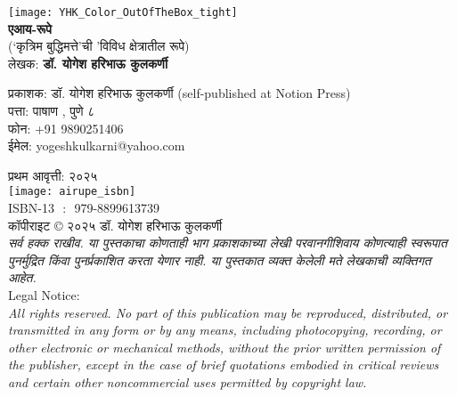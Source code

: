 \thispagestyle{empty}

\begin{center}
\texttt{[image: YHK\_Color\_OutOfTheBox\_tight]} \\[1.5em]

\textbf{\Huge एआय-रूपे}\\ [0.5em]
{\small(`कृत्रिम बुद्धिमत्ते'ची 'विविध क्षेत्रातील रूपे)}\\[0.5em]

लेखक: \textbf{{\large डॉ. योगेश हरिभाऊ कुलकर्णी}}\\[1.5em]
\end{center}

\vspace{1.5em}

\begin{flushleft}

प्रकाशक: डॉ. योगेश हरिभाऊ कुलकर्णी (self-published at Notion Press)\\
पत्ता:  पाषाण ,  पुणे ८ \\
फोन:  +91 9890251406\\
ईमेल: yogeshkulkarni@yahoo.com\\[1.5em]

\vspace{0.5em}

प्रथम आवृत्ती: २०२५\\[0.5em]

\texttt{[image: airupe\_isbn]} \\ [0.5em]
ISBN-13 ‏ : ‎ 979-8899613739\\[1.5em]

कॉपीराइट © २०२५ डॉ. योगेश हरिभाऊ कुलकर्णी\\[0.5em]

{\textit{सर्व हक्क राखीव. या पुस्तकाचा कोणताही भाग प्रकाशकाच्या लेखी परवानगीशिवाय कोणत्याही स्वरूपात पुनर्मुद्रित किंवा पुनर्प्रकाशित करता येणार नाही.  या पुस्तकात व्यक्त केलेली मते लेखकाची व्यक्तिगत आहेत.}}\\[1.5em]

{\large Legal Notice:}\\
{\textit{All rights reserved. No part of this publication may be reproduced, distributed, or transmitted in any form or by any means, including photocopying, recording, or other electronic or mechanical methods, without the prior written permission of the publisher, except in the case of brief quotations embodied in critical reviews and certain other noncommercial uses permitted by copyright law.}}
\end{flushleft}
\vfill\null
\clearpage

